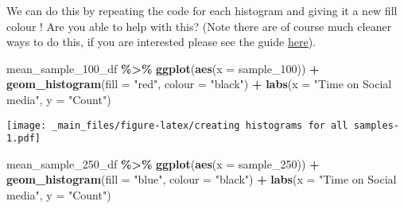 \documentclass[
]{book}
\newenvironment{Shaded}{\begin{snugshade}}{\end{snugshade}}
\newcommand{\AttributeTok}[1]{\textcolor[rgb]{0.13,0.29,0.53}{#1}}
\newcommand{\FunctionTok}[1]{\textcolor[rgb]{0.13,0.29,0.53}{\textbf{#1}}}
\newcommand{\NormalTok}[1]{#1}
\newcommand{\SpecialCharTok}[1]{\textcolor[rgb]{0.81,0.36,0.00}{\textbf{#1}}}
\newcommand{\StringTok}[1]{\textcolor[rgb]{0.31,0.60,0.02}{#1}}
\begin{document}
We can do this by repeating the code for each histogram and giving it a new fill colour ! Are you able to help with this? (Note there are of course much cleaner ways to do this, if you are interested please see the guide \href{https://www.datacamp.com/f/facets-ggplot-r?utm_source=google&utm_medium=paid_search&utm_campaignid=19589720824&utm_adgroupid=157156376351&utm_device=c&utm_keyword=&utm_matchtype=&utm_network=g&utm_adpostion=&utm_creative=733936254686&utm_targetid=aud-1832882613722:dsa-2218886984060&utm_loc_interest_ms=&utm_loc_physical_ms=9071851&utm_content=ps-other~apac-en~dsa~tofu~tutorial-r-programming&accountid=9624585688&utm_campaign=230119_1-ps-other~dsa~tofu_2-b2c_3-apac_4-prc_5-na_6-na_7-le_8-pdsh-go_9-nb-e_10-na_11-na&gad_source=1&gad_campaignid=19589720824&gbraid=0AAAAADQ9WsHmSJoqa8-5deMNCCGmJAmEp&gclid=CjwKCAjw9anCBhAWEiwAqBJ-c-0oZYPE5pP4Y6ZpYz0WabsrMLtJizQQn90osQAeAOfbaV9oUkleMxoClE4QAvD_BwE}{here}).

\begin{Shaded}
\begin{Highlighting}[]
\NormalTok{mean\_sample\_100\_df }\SpecialCharTok{\%\textgreater{}\%} 
\FunctionTok{ggplot}\NormalTok{(}\FunctionTok{aes}\NormalTok{(}\AttributeTok{x =}\NormalTok{ sample\_100)) }\SpecialCharTok{+}
  \FunctionTok{geom\_histogram}\NormalTok{(}\AttributeTok{fill =} \StringTok{"red"}\NormalTok{, }\AttributeTok{colour =} \StringTok{"black"}\NormalTok{) }\SpecialCharTok{+}
    \FunctionTok{labs}\NormalTok{(}\AttributeTok{x =} \StringTok{"Time on Social media"}\NormalTok{, }\AttributeTok{y =} \StringTok{"Count"}\NormalTok{)}
\end{Highlighting}
\end{Shaded}

\texttt{[image: \_main\_files/figure-latex/creating histograms for all samples-1.pdf]}

\begin{Shaded}
\begin{Highlighting}[]
\NormalTok{mean\_sample\_250\_df }\SpecialCharTok{\%\textgreater{}\%} 
\FunctionTok{ggplot}\NormalTok{(}\FunctionTok{aes}\NormalTok{(}\AttributeTok{x =}\NormalTok{ sample\_250)) }\SpecialCharTok{+}
  \FunctionTok{geom\_histogram}\NormalTok{(}\AttributeTok{fill =} \StringTok{"blue"}\NormalTok{, }\AttributeTok{colour =} \StringTok{"black"}\NormalTok{) }\SpecialCharTok{+}
    \FunctionTok{labs}\NormalTok{(}\AttributeTok{x =} \StringTok{"Time on Social media"}\NormalTok{, }\AttributeTok{y =} \StringTok{"Count"}\NormalTok{)}
\end{Highlighting}
\end{Shaded}
\end{document}
